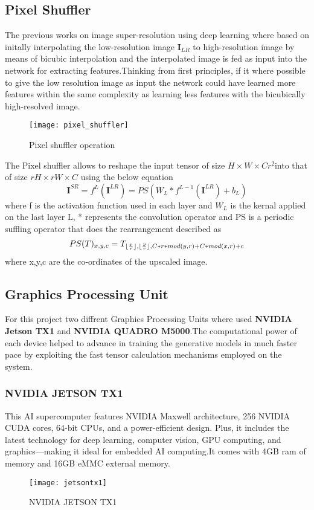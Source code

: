 \subsection{Pixel Shuffler}
The previous works on image super-resolution using deep learning  where based on initally interpolating the low-resolution image $\textbf{I}_{LR}$ to high-resolution image by means of bicubic interpolation and the interpolated image is fed as input into the network for extracting features.Thinking from first principles, if it where possible to give the low resolution image as input the network could have learned more features within the same complexity as learning less features with the bicubically high-resolved image.
\begin{figure}[h!]
 \centering
 \texttt{[image: pixel\_shuffler]}
 \caption{Pixel shuffler operation}
 \label{fig:pixelshuffler}
\end{figure}

The Pixel shuffler allows to reshape the input tensor of size $ H \times W \times Cr^2 $into that of size $rH \times rW \times C$ using the below equation
\begin{equation}
\textbf{I}^{SR} = f^L(\textbf{I}^{LR}) = PS(W_L * f^{L-1}(\textbf{I}^{LR}) + b_L)
\end{equation}
where f is the activation function used in each layer and $W_L$ is the kernal applied on the last layer L, * represents the convolution operator and  PS is a periodic suffling operator that does the rearrangement described as
\begin{equation}
PS(T)_{x,y,c} = T_{\lfloor\frac{x}{r}\rfloor,\lfloor\frac{y}{r}\rfloor,C*r*mod(y,r) + C*mod(x,r)+c}
\end{equation}
where x,y,c are the co-ordinates of the upscaled image.
\subsection{Graphics Processing Unit}
For this project two diffrent Graphics Processing Units where used \textbf{NVIDIA Jetson TX1} and \textbf{NVIDIA QUADRO M5000}.The computational power of each device helped to advance in training the generative models in much faster pace by exploiting the fast tensor calculation mechanisms employed on the system.

\subsubsection{NVIDIA JETSON TX1}
This AI supercomputer features NVIDIA Maxwell architecture, 256 NVIDIA CUDA cores, 64-bit CPUs, and a power-efficient design. Plus, it includes the latest technology for deep learning, computer vision, GPU computing, and graphics—making it ideal for embedded AI computing.It comes with 4GB ram of memory and 16GB eMMC external memory.
\begin{figure}[h!]
 \centering
 \texttt{[image: jetsontx1]}
 \caption{NVIDIA JETSON TX1}
 \label{fig:jetson}
\end{figure}
